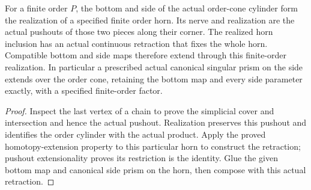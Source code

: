 \begin{proposition}
  \leanok
  For a finite order $P$, the bottom and side of the actual order-cone cylinder form the realization of a specified finite order horn. Its nerve and realization are the actual pushouts of those two pieces along their corner. The realized horn inclusion has an actual continuous retraction that fixes the whole horn. Compatible bottom and side maps therefore extend through this finite-order realization. In particular a prescribed actual canonical singular prism on the side extends over the order cone, retaining the bottom map and every side parameter exactly, with a specified finite-order factor.
\end{proposition}
\begin{proof}
  Inspect the last vertex of a chain to prove the simplicial cover and intersection and hence the actual pushout. Realization preserves this pushout and identifies the order cylinder with the actual product. Apply the proved homotopy-extension property to this particular horn to construct the retraction; pushout extensionality proves its restriction is the identity. Glue the given bottom map and canonical side prism on the horn, then compose with this actual retraction.
  \leanok
\end{proof}

